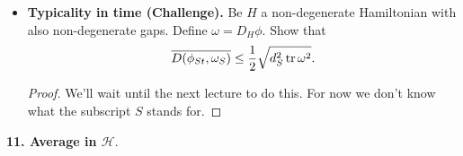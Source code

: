 \documentclass{book}
\theoremstyle{definition}
\newcommand{\lag}{\mathcal{L}}
\newcommand{\nn}{\nonumber}
\newcommand{\had}{\mathcal{H}}
\newcommand{\f}[2]{\frac{#1}{#2}}
\newcommand{\lp}{\left(}
\newcommand{\rp}{\right)}
\newcommand{\lb}{\left[}
\newcommand{\rb}{\right]}
\begin{document}
\begin{itemize}
	
	\begin{proof}
		Well, just crank:
		\begin{align}
		\overline{\lag_t} &= \lim_{T\to \infty}\f{1}{T}\int^T_0 \braket{\phi}{\phi_t}\braket{\phi_t}{\phi}\,dt\nn\\
		&= \lim_{T\to \infty}\f{1}{T}\int^T_0 dt\, \lb \sum_n a_n^\dagger \braket{E_n}{e^{-iHt}\phi e^{iHt}}  \rb \times \text{c.c.}\nn\\
		&= \lim_{T\to \infty}\f{1}{T}\int^T_0 dt\, \lb \sum_n \sum_m a_n^\dagger a_m \braket{E_n}{E_m} e^{-i(E_n - E_m)t}  \rb \times \text{c.c.}\nn\\
		&= \sum_{n,m} a^\dagger_n a_n a_m^\dagger a_m\nn\\
		&= \tr  \lp \sum_n a_n^\dagger a_n \ket{n}\bra{n} \sum_m a_m^\dagger a_m\ket{m}\bra{m} \rp \nn\\
		&= \tr \lp \lb \sum_n \abs{a_n}^2 P_n \rb^2  \rp   \nn\\
		&= \tr(\bar{\phi}^2).
		\end{align}
	\end{proof}
	
	
	\item \textbf{Typicality in time (Challenge).} Be $H$ a non-degenerate Hamiltonian with also non-degenerate gaps. Define $\omega = D_H \phi$. Show that 
	\begin{align}
	\overline{D(\phi_{St}, \omega_S)} \leq \f{1}{2}\sqrt{d_S^2\tr \omega^2}.
	\end{align}
	
	
	\begin{proof}
		We'll wait until the next lecture to do this. For now we don't know what the subscript $S$ stands for. 
	\end{proof}
	
	
	
	
	
	
\end{itemize}




\noindent \textbf{11. Average in $\had$}.
\end{document}
